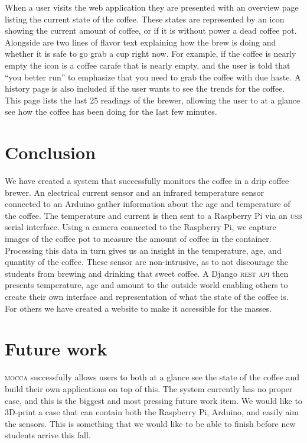 \documentclass[12pt,a4paper,oneside,article]{memoir}
\numberwithin{equation}{chapter}
\begin{document}
When a user visits the web application they are presented with an overview page
listing the current state of the coffee. These states are represented by an icon
showing the current amount of coffee, or if it is without power a dead coffee
pot. Alongside are two lines of flavor text explaining how the brew is doing and
whether it is safe to go grab a cup right now. For example, if the coffee is
nearly empty the icon is a coffee carafe that is nearly empty, and the user is
told that ``you better run'' to emphasize that you need to grab the coffee with
due haste. A history page is also included if the user wants to see the trends
for the coffee. This page lists the last 25 readings of the brewer, allowing the
user to at a glance see how the coffee has been doing for the last few minutes.

\section{Conclusion}\label{sec:conclusion}
We have created a system that successfully monitors the coffee in a drip coffee
brewer. An electrical current sensor and an infrared temperature sensor
connected to an Arduino gather information about the age and temperature of the
coffee. The temperature and current is then sent to a Raspberry Pi via an
\textsc{usb} serial interface. Using a camera connected to the Raspberry Pi, we
capture images of the coffee pot to measure the amount of coffee in the
container. Processing this data in turn gives us an insight in the temperature,
age, and quantity of the coffee. These sensor are non-intrusive, as to not
discourage the students from brewing and drinking that sweet coffee. A Django
\textsc{rest api} then presents temperature, age and amount to the outside world
enabling others to create their own interface and representation of what the
state of the coffee is. For others we have created a website to make it
accessible for the masses.
 
\section{Future work}\label{sec:future-work}
\textsc{mocca} successfully allows users to both at a glance see the state of
the coffee and build their own applications on top of this. The system currently
has no proper case, and this is the biggest and most pressing future work item.
We would like to 3D-print a case that can contain both the Raspberry Pi,
Arduino, and easily aim the sensors. This is something that we would like to be
able to finish before new students arrive this fall.
\end{document}
